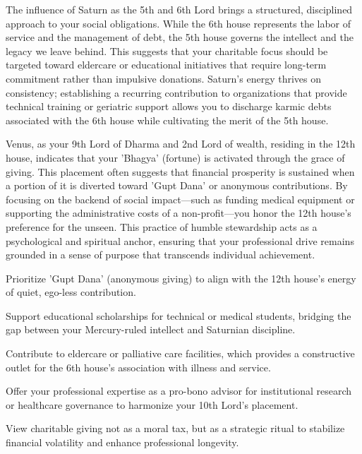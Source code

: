 {\fontsize{9}{13}\selectfont The influence of Saturn as the 5th and 6th Lord brings a structured, disciplined approach to your social obligations. While the 6th house represents the labor of service and the management of debt, the 5th house governs the intellect and the legacy we leave behind. This suggests that your charitable focus should be targeted toward eldercare or educational initiatives that require long-term commitment rather than impulsive donations. Saturn's energy thrives on consistency; establishing a recurring contribution to organizations that provide technical training or geriatric support allows you to discharge karmic debts associated with the 6th house while cultivating the merit of the 5th house.}\par\vspace{1.8mm}

{\fontsize{9}{13}\selectfont Venus, as your 9th Lord of Dharma and 2nd Lord of wealth, residing in the 12th house, indicates that your 'Bhagya' (fortune) is activated through the grace of giving. This placement often suggests that financial prosperity is sustained when a portion of it is diverted toward 'Gupt Dana' or anonymous contributions. By focusing on the backend of social impact---such as funding medical equipment or supporting the administrative costs of a non-profit---you honor the 12th house's preference for the unseen. This practice of humble stewardship acts as a psychological and spiritual anchor, ensuring that your professional drive remains grounded in a sense of purpose that transcends individual achievement.}\par\vspace{1.8mm}

\begin{diamondlist}
  \item {\fontsize{8.5}{12}\selectfont Prioritize 'Gupt Dana' (anonymous giving) to align with the 12th house's energy of quiet, ego-less contribution.}
  \item {\fontsize{8.5}{12}\selectfont Support educational scholarships for technical or medical students, bridging the gap between your Mercury-ruled intellect and Saturnian discipline.}
  \item {\fontsize{8.5}{12}\selectfont Contribute to eldercare or palliative care facilities, which provides a constructive outlet for the 6th house's association with illness and service.}
  \item {\fontsize{8.5}{12}\selectfont Offer your professional expertise as a pro-bono advisor for institutional research or healthcare governance to harmonize your 10th Lord's placement.}
  \item {\fontsize{8.5}{12}\selectfont View charitable giving not as a moral tax, but as a strategic ritual to stabilize financial volatility and enhance professional longevity.}
\end{diamondlist}


